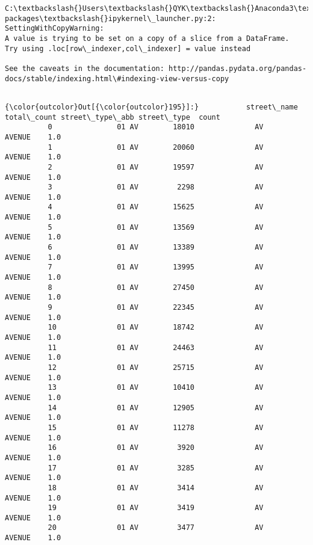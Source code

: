 \documentclass[11pt]{article}
\begin{document}
    \begin{Verbatim}[commandchars=\\\{\}]
C:\textbackslash{}Users\textbackslash{}QYK\textbackslash{}Anaconda3\textbackslash{}lib\textbackslash{}site-packages\textbackslash{}ipykernel\_launcher.py:2: SettingWithCopyWarning: 
A value is trying to be set on a copy of a slice from a DataFrame.
Try using .loc[row\_indexer,col\_indexer] = value instead

See the caveats in the documentation: http://pandas.pydata.org/pandas-docs/stable/indexing.html\#indexing-view-versus-copy
  

    \end{Verbatim}

\begin{Verbatim}[commandchars=\\\{\}]
{\color{outcolor}Out[{\color{outcolor}195}]:}           street\_name  total\_count street\_type\_abb street\_type  count
          0               01 AV        18010              AV      AVENUE    1.0
          1               01 AV        20060              AV      AVENUE    1.0
          2               01 AV        19597              AV      AVENUE    1.0
          3               01 AV         2298              AV      AVENUE    1.0
          4               01 AV        15625              AV      AVENUE    1.0
          5               01 AV        13569              AV      AVENUE    1.0
          6               01 AV        13389              AV      AVENUE    1.0
          7               01 AV        13995              AV      AVENUE    1.0
          8               01 AV        27450              AV      AVENUE    1.0
          9               01 AV        22345              AV      AVENUE    1.0
          10              01 AV        18742              AV      AVENUE    1.0
          11              01 AV        24463              AV      AVENUE    1.0
          12              01 AV        25715              AV      AVENUE    1.0
          13              01 AV        10410              AV      AVENUE    1.0
          14              01 AV        12905              AV      AVENUE    1.0
          15              01 AV        11278              AV      AVENUE    1.0
          16              01 AV         3920              AV      AVENUE    1.0
          17              01 AV         3285              AV      AVENUE    1.0
          18              01 AV         3414              AV      AVENUE    1.0
          19              01 AV         3419              AV      AVENUE    1.0
          20              01 AV         3477              AV      AVENUE    1.0

\end{Verbatim}
\end{document}

